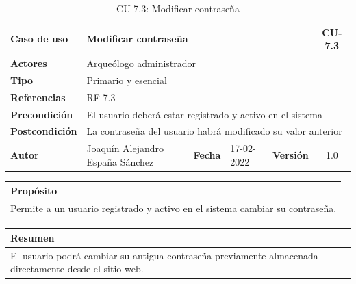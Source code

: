     \begin{table}[H]
    \begin{center}
        \begin{adjustbox}{width=\textwidth}
        \begin{tabular}{ | l | l | l | l | c | c | } 
            \hline
            \textbf{Caso de uso} & \multicolumn{4}{l|}{Modificar contraseña} & \cellcolor{gray!50} \textbf{CU-7.3}\\
            \hline
            \textbf{Actores} & \multicolumn{5}{p{0.9\linewidth}|}{Arqueólogo administrador} \\
            \hline
            \textbf{Tipo} & \multicolumn{5}{l|}{Primario y esencial} \\
            \hline
            \textbf{Referencias} & \multicolumn{3}{l|}{RF-7.3} & \multicolumn{2}{l|}{ }\\
            \hline
            \textbf{Precondición} & \multicolumn{5}{l|}{El usuario deberá estar registrado y activo en el sistema} \\
            \hline
            \textbf{Postcondición} & \multicolumn{5}{l|}{La contraseña del usuario habrá modificado su valor anterior} \\
            \hline
            \textbf{Autor} & \multicolumn{1}{p{0.25\linewidth}|}{Joaquín Alejandro España Sánchez} & \textbf{Fecha} & 
            17-02-2022     & \textbf{Versión}                                                      & 1.0\\
            \hline
        \end{tabular}
        \end{adjustbox}
        \caption{CU-7.3: Modificar contraseña}
        \label{tab:modify-password}
    \end{center}
    \end{table}

    \begin{table}[H]
        \centering
        \begin{tabularx}{\textwidth}{@{} |L |@{}} \hline
            \textbf{Propósito} \\
            \hline
            Permite a un usuario registrado y activo en el sistema cambiar su contraseña. \\
            \hline
        \end{tabularx}
    \end{table}

    \begin{table}[H]
        \centering
        \begin{tabularx}{\textwidth}{@{} |L |@{}} \hline
            \textbf{Resumen} \\
            \hline
            El usuario podrá cambiar su antigua contraseña previamente almacenada directamente
            desde el sitio web.\\
            \hline
        \end{tabularx}
    \end{table}


